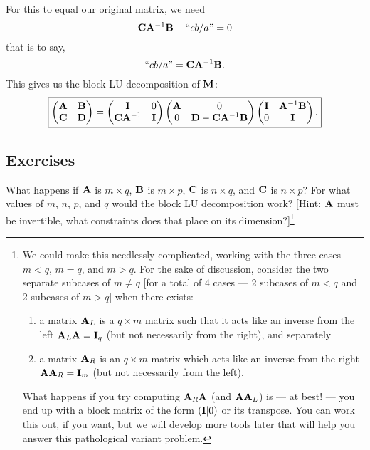 For this to equal our original matrix, we need
\begin{equation}
\mathbf{C}\mathbf{A}^{-1}\mathbf{B}- \mbox{``$cb/a$''}=0
\end{equation}
that is to say,
\begin{equation}
\mbox{``$cb/a$''} =\mathbf{C}\mathbf{A}^{-1}\mathbf{B}.
\end{equation}
This gives us the block LU decomposition of $\mathbf{M}$:
\begin{equation}
\boxed{
\begin{pmatrix}
  \mathbf{A} & \mathbf{B}\\
  \mathbf{C} & \mathbf{D}
\end{pmatrix}
 = 
\begin{pmatrix}
             \mathbf{I} & 0\\
  \mathbf{C}\mathbf{A}^{-1} & \mathbf{I}
\end{pmatrix}
\begin{pmatrix}
  \mathbf{A} & 0\\
        0 & \mathbf{D} - \mathbf{C}\mathbf{A}^{-1}\mathbf{B}
\end{pmatrix}
\begin{pmatrix}
  \mathbf{I} & \mathbf{A}^{-1}\mathbf{B}\\
        0 & \mathbf{I}
\end{pmatrix}.}
\end{equation}




\subsection*{Exercises}

\begin{exercise}
What happens if $\mathbf{A}$ is $m\times q$, $\mathbf{B}$ is $m\times p$,
$\mathbf{C}$ is $n\times q$, and $\mathbf{C}$ is $n\times p$? For what values
of $m$, $n$, $p$, and $q$ would the block LU decomposition
work? [Hint: $\mathbf{A}$ must be invertible, what constraints does that
  place on its dimension?]\footnote{We could make this needlessly
complicated, working with the three cases $m<q$, $m=q$, and $m>q$.
For the sake of discussion, consider the two separate subcases of $m\neq q$
[for a total of 4 cases --- 2 subcases of $m<q$ and 2 subcases of $m>q$]
when there exists:
\begin{enumerate}
\item a matrix $\mathbf{A}_{L}$ is a $q\times m$
matrix such that it acts like an inverse from the left
$\mathbf{A}_{L}\mathbf{A}=\mathbf{I}_{q}$ (but not necessarily from the right),
and separately
\item a matrix $\mathbf{A}_{R}$ is an $q\times m$ matrix which acts like an inverse
from the right $\mathbf{A}\mathbf{A}_{R}=\mathbf{I}_{m}$ (but not necessarily
from the left).
\end{enumerate}
What happens if you try computing $\mathbf{A}_{R}\mathbf{A}$ (and
$\mathbf{A}\mathbf{A}_{L}$) is --- at best! --- you end up with a block matrix
of the form $(\mathbf{I}|0)$ or its transpose.
You can work this out, if you want, but we will develop more tools later
that will help you answer this pathological variant problem.}
\end{exercise}

